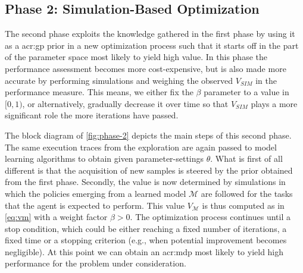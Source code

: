 


\subsection{Phase 2: Simulation-Based Optimization}
\label{sec:phase-2}

The second phase exploits the knowledge gathered in the first phase by using it as a \acrshort{acr:gp} prior in a new optimization process such that it starts off in the part of the parameter space most likely to yield high value.
In this phase the performance assessment becomes more cost-expensive, but is also made more accurate by performing simulations and weighing the observed $V_\mathit{SIM}$ in the performance measure.
This means, we either fix the $\beta$ parameter to a value in $[0, 1)$, or alternatively, gradually decrease it over time so that $V_\mathit{SIM}$ plays a more significant role the more iterations have passed.

The block diagram of \autoref{fig:phase-2} depicts the main steps of this second phase.
The same execution traces from the exploration are again passed to model learning algorithms to obtain  given parameter-settings $\theta$.
What is first of all different is that the acquisition of new samples is steered by the prior obtained from the first phase.
Secondly, the value is now determined by simulations in which the policies emerging from a learned model $\mathcal{M}$ are followed for the tasks that the agent is expected to perform.
This value $V_\mathcal{M}$ is thus computed as in \autoref{eq:vm} with a weight factor $\beta > 0$.
The optimization process continues until a stop condition, which could be either reaching a fixed number of iterations, a fixed time or a stopping criterion (e.g., when potential improvement becomes negligible).
At this point we can obtain an \acrshort{acr:mdp} most likely to yield high performance for the problem under consideration.


